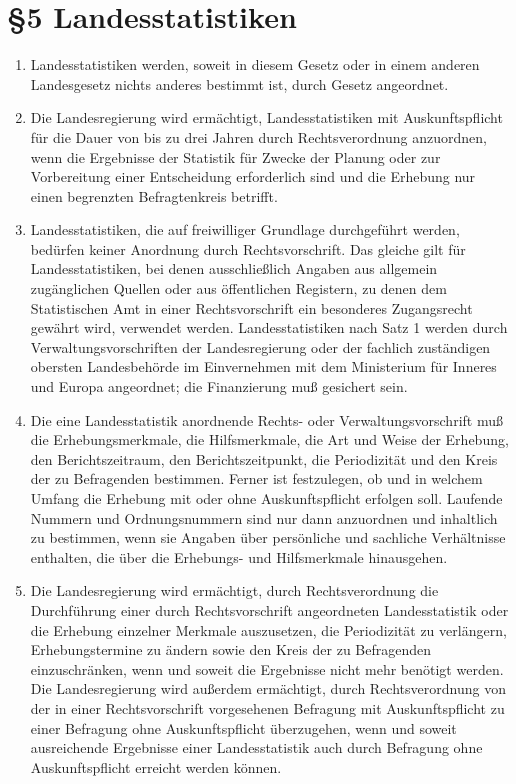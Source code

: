     \section{\S5 Landesstatistiken}
        \begin{enumerate}[label=(\arabic*)]
            \item Landesstatistiken werden, soweit in diesem Gesetz oder in einem anderen Landesgesetz nichts anderes bestimmt ist, durch Gesetz angeordnet.
            \item Die Landesregierung wird ermächtigt, Landesstatistiken mit Auskunftspflicht für die Dauer von bis zu drei Jahren durch Rechtsverordnung anzuordnen, wenn die Ergebnisse der Statistik für Zwecke der Planung oder zur Vorbereitung einer Entscheidung erforderlich sind und die Erhebung nur einen begrenzten Befragtenkreis betrifft.
            \item Landesstatistiken, die auf freiwilliger Grundlage durchgeführt werden, bedürfen keiner Anordnung durch Rechtsvorschrift. Das gleiche gilt für Landesstatistiken, bei denen ausschließlich Angaben aus allgemein zugänglichen Quellen oder aus öffentlichen Registern, zu denen dem Statistischen Amt in einer Rechtsvorschrift ein besonderes Zugangsrecht gewährt wird, verwendet werden. Landesstatistiken nach Satz 1 werden durch Verwaltungsvorschriften der Landesregierung oder der fachlich zuständigen obersten Landesbehörde im Einvernehmen mit dem Ministerium für Inneres und Europa angeordnet; die Finanzierung muß gesichert sein.
            \item Die eine Landesstatistik anordnende Rechts- oder Verwaltungsvorschrift muß die Erhebungsmerkmale, die Hilfsmerkmale, die Art und Weise der Erhebung, den Berichtszeitraum, den Berichtszeitpunkt, die Periodizität und den Kreis der zu Befragenden bestimmen. Ferner ist festzulegen, ob und in welchem Umfang die Erhebung mit oder ohne Auskunftspflicht erfolgen soll. Laufende Nummern und Ordnungsnummern sind nur dann anzuordnen und inhaltlich zu bestimmen, wenn sie Angaben über persönliche und sachliche Verhältnisse enthalten, die über die Erhebungs- und Hilfsmerkmale hinausgehen.
            \item Die Landesregierung wird ermächtigt, durch Rechtsverordnung die Durchführung einer durch Rechtsvorschrift angeordneten Landesstatistik oder die Erhebung einzelner Merkmale auszusetzen, die Periodizität zu verlängern, Erhebungstermine zu ändern sowie den Kreis der zu Befragenden einzuschränken, wenn und soweit die Ergebnisse nicht mehr benötigt werden. Die Landesregierung wird außerdem ermächtigt, durch Rechtsverordnung von der in einer Rechtsvorschrift vorgesehenen Befragung mit Auskunftspflicht zu einer Befragung ohne Auskunftspflicht überzugehen, wenn und soweit ausreichende Ergebnisse einer Landesstatistik auch durch Befragung ohne Auskunftspflicht erreicht werden können.
        \end{enumerate}

